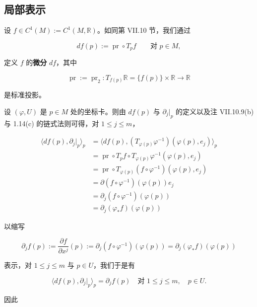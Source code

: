 \subsection*{局部表示}

设 $ f\in C^{1}(M) := C^{1}(M,\mathbb{R}) $。如同第 VII.10 节，我们通过

\[
df(p) := \operatorname{pr}\circ T_{p}f \qquad \text{对 } p\in M,
\]

定义 $ f $ 的\textbf{微分} $ df $，其中

\[
\operatorname{pr} := \operatorname{pr}_{2} : T_{f(p)}\mathbb{R} = \{f(p)\}\times\mathbb{R}\to\mathbb{R}
\]

是标准投影。

设 $ (\varphi,U) $ 是 $ p\in M $ 处的坐标卡。则由 $ df(p) $ 与 $ \partial_{j}|_{p} $ 的定义以及注 VII.10.9(b) 与 1.14(c) 的链式法则可得，对 $ 1\le j\le m $，

\begin{equation*}
\begin{aligned}
\langle df(p),\partial_{j}|_{p}\rangle_{p} &= \langle df(p),(T_{\varphi(p)}\varphi^{-1})(\varphi(p),e_{j})\rangle_{p}\\ &= \operatorname{pr}\circ T_{p}f\circ T_{\varphi(p)}\varphi^{-1}(\varphi(p),e_{j})\\ &= \operatorname{pr}\circ T_{\varphi(p)}(f\circ\varphi^{-1})(\varphi(p),e_{j})\\ &= \partial(f\circ\varphi^{-1})(\varphi(p))e_{j}\\ &= \partial_{j}(f\circ\varphi^{-1})(\varphi(p))\\ &= \partial_{j}(\varphi_{\ast}f)(\varphi(p))
\end{aligned}
\end{equation*}

以缩写

\begin{equation}
\partial_{j}f(p) := \frac{\partial f}{\partial x^{j}}(p) := \partial_{j}(f\circ\varphi^{-1})(\varphi(p)) = \partial_{j}(\varphi_{\ast}f)(\varphi(p))\tag{4.3}
\end{equation}

表示，对 $ 1\le j\le m $ 与 $ p\in U $，我们于是有

\begin{equation}
\langle df(p),\partial_{j}|_{p}\rangle_{p} = \partial_{j}f(p) \quad \text{对 } 1\le j\le m, \quad p\in U.\tag{4.4}
\end{equation}

因此

